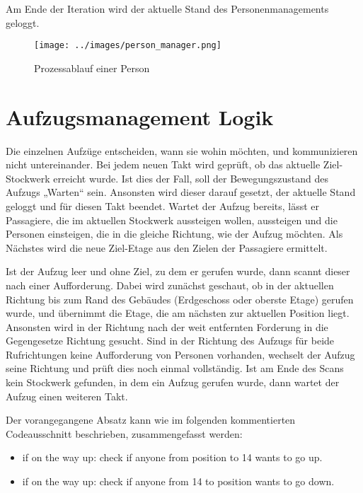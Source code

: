 \documentclass[envcountsame, envcountchap, deutsch]{i-studis}
\providecommand{\tightlist}{%
  \setlength{\itemsep}{0pt}\setlength{\parskip}{0pt}}
\begin{document}
Am Ende der Iteration wird der aktuelle Stand des Personenmanagements
geloggt.

\begin{figure}
\centering
\texttt{[image: ../images/person\_manager.png]}
\caption{Prozessablauf einer Person}
\end{figure}

\hypertarget{aufzugsmanagement-logik}{%
\chapter{Aufzugsmanagement Logik}\label{aufzugsmanagement-logik}}

Die einzelnen Aufzüge entscheiden, wann sie wohin möchten, und
kommunizieren nicht untereinander. Bei jedem neuen Takt wird geprüft, ob
das aktuelle Ziel-Stockwerk erreicht wurde. Ist dies der Fall, soll der
Bewegungszustand des Aufzugs „Warten`` sein. Ansonsten wird dieser
darauf gesetzt, der aktuelle Stand geloggt und für diesen Takt beendet.
Wartet der Aufzug bereits, lässt er Passagiere, die im aktuellen
Stockwerk aussteigen wollen, aussteigen und die Personen einsteigen, die
in die gleiche Richtung, wie der Aufzug möchten. Als Nächstes wird die
neue Ziel-Etage aus den Zielen der Passagiere ermittelt.

Ist der Aufzug leer und ohne Ziel, zu dem er gerufen wurde, dann scannt
dieser nach einer Aufforderung. Dabei wird zunächst geschaut, ob in der
aktuellen Richtung bis zum Rand des Gebäudes (Erdgeschoss oder oberste
Etage) gerufen wurde, und übernimmt die Etage, die am nächsten zur
aktuellen Position liegt. Ansonsten wird in der Richtung nach der weit
entfernten Forderung in die Gegengesetze Richtung gesucht. Sind in der
Richtung des Aufzugs für beide Rufrichtungen keine Aufforderung von
Personen vorhanden, wechselt der Aufzug seine Richtung und prüft dies
noch einmal vollständig. Ist am Ende des Scans kein Stockwerk gefunden,
in dem ein Aufzug gerufen wurde, dann wartet der Aufzug einen weiteren
Takt.

Der vorangegangene Absatz kann wie im folgenden kommentierten
Codeausschnitt beschrieben, zusammengefasst werden:

\begin{itemize}
\tightlist
\item
  if on the way up: check if anyone from position to 14 wants to go up.
\item
  if on the way up: check if anyone from 14 to position wants to go
  down.
\end{itemize}
\end{document}
